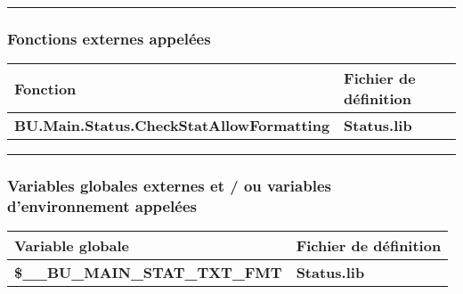 \documentclass[a4paper,10pt]{article}
\begin{document}
\setlength{\parskip}{2em}



\color{sec3}\par\noindent\rule{\textwidth}{0.4pt}\color{text}\setlength{\parskip}{1em}

\color{sec3}
\subsubsection{Fonctions externes appelées}\color{text}

\begin{justify}
    \begin{tabular}{|l|l|}
        \hline
        \textbf{Fonction} & \textbf{Fichier de définition}\\
        \hline
        \textbf{\color{func}BU.Main.Status.CheckStatAllowFormatting} & \textbf{\color{path}Status.lib}\\
        \hline
    \end{tabular}
\end{justify}

\setlength{\parskip}{2em}



\color{sec3}\par\noindent\rule{\textwidth}{0.4pt}\color{text}\setlength{\parskip}{1em}

\color{sec3}
\subsubsection{Variables globales externes et / ou variables d'environnement appelées}\color{text}

\begin{justify}
    \begin{tabular}{|l|l|}
        \hline
        \textbf{Variable globale}                           & \textbf{Fichier de définition}\\
        \hline
        \textbf{\color{vars}\$\_\_BU\_MAIN\_STAT\_TXT\_FMT} & \textbf{\color{path}Status.lib}\\
        \hline
    \end{tabular}
\end{justify}

\setlength{\parskip}{2em}


\end{document}
